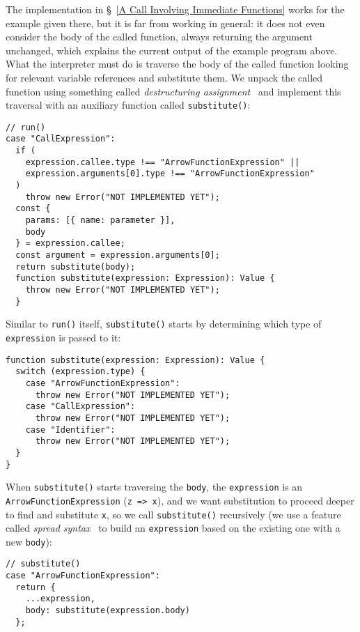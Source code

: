 \documentclass[12pt, oneside]{book}
\begin{document}
\noindent The implementation in §~\ref{A Call Involving Immediate Functions} works for the example given there, but it is far from working in general: it does not even consider the body of the called function, always returning the argument unchanged, which explains the current output of the example program above. What the interpreter must do is traverse the body of the called function looking for relevant variable references and substitute them. We unpack the called function using something called \emph{destructuring assignment}~\cite{destructuring-assignment} and implement this traversal with an auxiliary function called \texttt{substitute()}:

\begin{verbatim}
// run()
case "CallExpression":
  if (
    expression.callee.type !== "ArrowFunctionExpression" ||
    expression.arguments[0].type !== "ArrowFunctionExpression"
  )
    throw new Error("NOT IMPLEMENTED YET");
  const {
    params: [{ name: parameter }],
    body
  } = expression.callee;
  const argument = expression.arguments[0];
  return substitute(body);
  function substitute(expression: Expression): Value {
    throw new Error("NOT IMPLEMENTED YET");
  }
\end{verbatim}

Similar to \texttt{run()} itself, \texttt{substitute()} starts by determining which type of \texttt{expression} is passed to it:

\begin{verbatim}
function substitute(expression: Expression): Value {
  switch (expression.type) {
    case "ArrowFunctionExpression":
      throw new Error("NOT IMPLEMENTED YET");
    case "CallExpression":
      throw new Error("NOT IMPLEMENTED YET");
    case "Identifier":
      throw new Error("NOT IMPLEMENTED YET");
  }
}
\end{verbatim}

When \texttt{substitute()} starts traversing the \texttt{body}, the \texttt{expression} is an \texttt{ArrowFunctionExpression} (\texttt{z => x}), and we want substitution to proceed deeper to find and substitute \texttt{x}, so we call \texttt{substitute()} recursively (we use a feature called \emph{spread syntax}~\cite{spread-syntax} to build an \texttt{expression} based on the existing one with a new \texttt{body}):

\begin{verbatim}
// substitute()
case "ArrowFunctionExpression":
  return {
    ...expression,
    body: substitute(expression.body)
  };
\end{verbatim}
\end{document}
